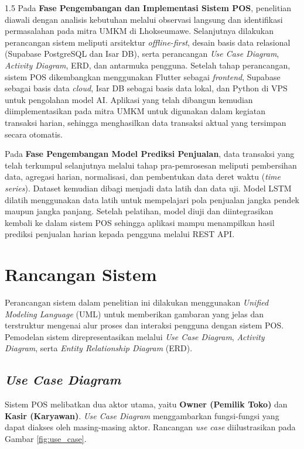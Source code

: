 \documentclass[12pt, a4paper, onecolumn, oneside]{report}
\begin{document}
\begin{spacing}{1.5}
Pada \textbf{Fase Pengembangan dan Implementasi Sistem POS}, penelitian diawali dengan analisis kebutuhan melalui observasi langsung dan identifikasi permasalahan pada mitra UMKM di Lhokseumawe. Selanjutnya dilakukan perancangan sistem meliputi arsitektur \textit{offline-first}, desain basis data relasional (Supabase PostgreSQL dan Isar DB), serta perancangan \textit{Use Case Diagram}, \textit{Activity Diagram}, ERD, dan antarmuka pengguna. Setelah tahap perancangan, sistem POS dikembangkan menggunakan Flutter sebagai \textit{frontend}, Supabase sebagai basis data \textit{cloud}, Isar DB sebagai basis data lokal, dan Python di VPS untuk pengolahan model AI. Aplikasi yang telah dibangun kemudian diimplementasikan pada mitra UMKM untuk digunakan dalam kegiatan transaksi harian, sehingga menghasilkan data transaksi aktual yang tersimpan secara otomatis.

Pada \textbf{Fase Pengembangan Model Prediksi Penjualan}, data transaksi yang telah terkumpul selanjutnya melalui tahap pra-pemrosesan meliputi pembersihan data, agregasi harian, normalisasi, dan pembentukan data deret waktu (\textit{time series}). Dataset kemudian dibagi menjadi data latih dan data uji. Model LSTM dilatih menggunakan data latih untuk mempelajari pola penjualan jangka pendek maupun jangka panjang. Setelah pelatihan, model diuji dan diintegrasikan kembali ke dalam sistem POS sehingga aplikasi mampu menampilkan hasil prediksi penjualan harian kepada pengguna melalui REST API.

\section{Rancangan Sistem}

Perancangan sistem dalam penelitian ini dilakukan menggunakan \textit{Unified Modeling Language} (UML) untuk memberikan gambaran yang jelas dan terstruktur mengenai alur proses dan interaksi pengguna dengan sistem POS. Pemodelan sistem direpresentasikan melalui \textit{Use Case Diagram}, \textit{Activity Diagram}, serta \textit{Entity Relationship Diagram} (ERD).

\subsection{\textit{Use Case Diagram}}

Sistem POS melibatkan dua aktor utama, yaitu \textbf{Owner (Pemilik Toko)} dan \textbf{Kasir (Karyawan)}. \textit{Use Case Diagram} menggambarkan fungsi-fungsi yang dapat diakses oleh masing-masing aktor. Rancangan \textit{use case} diilustrasikan pada Gambar \ref{fig:use_case}.


\end{spacing}
\end{document}
